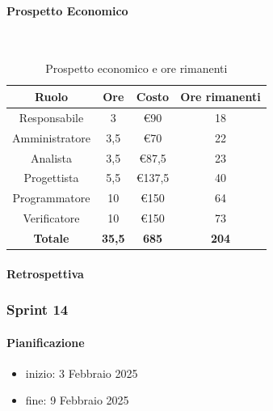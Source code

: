 \documentclass{article}
\begin{document}
                \paragraph{Prospetto Economico}\mbox{}\\
                \begin{table}[H]
                    \centering
                    \begin{tabular}{|c|c|c|c|}
                    \hline
                    \textbf{Ruolo}  & \textbf{Ore}  & \textbf{Costo} & \textbf{Ore rimanenti} \\ \hline
                    Responsabile    & 3             & €90            & 18                     \\ \hline
                    Amministratore  & 3,5           & €70            & 22                     \\ \hline
                    Analista        & 3,5           & €87,5          & 23                     \\ \hline
                    Progettista     & 5,5           & €137,5         & 40                     \\ \hline
                    Programmatore   & 10            & €150           & 64                     \\ \hline
                    Verificatore    & 10            & €150           & 73                     \\ \hline
                    \textbf{Totale} & \textbf{35,5} & \textbf{685}   & \textbf{204}         \\ \hline
                    \end{tabular}
                    \caption{Prospetto economico e ore rimanenti}
                \end{table}

                \paragraph{Retrospettiva}
            \subsubsection{Sprint 14}
                \paragraph{Pianificazione}
                \begin{itemize}
                    \item inizio: 3 Febbraio 2025
                    \item fine: 9 Febbraio 2025
                \end{itemize}
\end{document}
